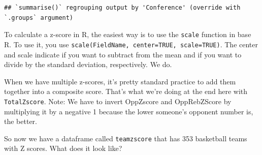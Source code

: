 \documentclass[
]{book}
\newenvironment{Shaded}{\begin{snugshade}}{\end{snugshade}}
\newcommand{\DataTypeTok}[1]{\textcolor[rgb]{0.13,0.29,0.53}{#1}}
\newcommand{\DecValTok}[1]{\textcolor[rgb]{0.00,0.00,0.81}{#1}}
\newcommand{\KeywordTok}[1]{\textcolor[rgb]{0.13,0.29,0.53}{\textbf{#1}}}
\newcommand{\NormalTok}[1]{#1}
\newcommand{\OperatorTok}[1]{\textcolor[rgb]{0.81,0.36,0.00}{\textbf{#1}}}
\newcommand{\OtherTok}[1]{\textcolor[rgb]{0.56,0.35,0.01}{#1}}
\newcommand{\StringTok}[1]{\textcolor[rgb]{0.31,0.60,0.02}{#1}}
\begin{document}
\begin{verbatim}
## `summarise()` regrouping output by 'Conference' (override with `.groups` argument)
\end{verbatim}

To calculate a z-score in R, the easiest way is to use the \texttt{scale} function in base R. To use it, you use \texttt{scale(FieldName,\ center=TRUE,\ scale=TRUE)}. The center and scale indicate if you want to subtract from the mean and if you want to divide by the standard deviation, respectively. We do.

When we have multiple z-scores, it's pretty standard practice to add them together into a composite score. That's what we're doing at the end here with \texttt{TotalZscore}. Note: We have to invert OppZscore and OppRebZScore by multiplying it by a negative 1 because the lower someone's opponent number is, the better.

\begin{Shaded}
\end{Shaded}

So now we have a dataframe called \texttt{teamzscore} that has 353 basketball teams with Z scores. What does it look like?
\end{document}

